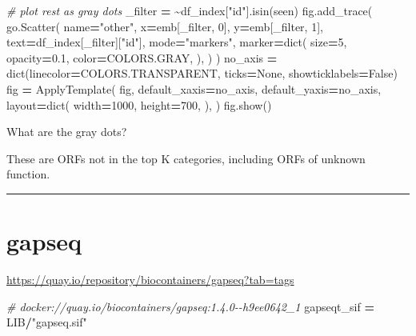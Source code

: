\documentclass[
]{book}
\newenvironment{Shaded}{\begin{snugshade}}{\end{snugshade}}
\newcommand{\BuiltInTok}[1]{#1}
\newcommand{\CommentTok}[1]{\textcolor[rgb]{0.56,0.35,0.01}{\textit{#1}}}
\newcommand{\DecValTok}[1]{\textcolor[rgb]{0.00,0.00,0.81}{#1}}
\newcommand{\FloatTok}[1]{\textcolor[rgb]{0.00,0.00,0.81}{#1}}
\newcommand{\NormalTok}[1]{#1}
\newcommand{\OperatorTok}[1]{\textcolor[rgb]{0.81,0.36,0.00}{\textbf{#1}}}
\newcommand{\StringTok}[1]{\textcolor[rgb]{0.31,0.60,0.02}{#1}}
\newcommand{\VariableTok}[1]{\textcolor[rgb]{0.00,0.00,0.00}{#1}}
\begin{document}
\begin{Shaded}
\begin{Highlighting}[numbers=left,,]
\CommentTok{\# plot rest as gray dots}
\NormalTok{\_filter }\OperatorTok{=} \OperatorTok{\textasciitilde{}}\NormalTok{df\_index[}\StringTok{"id"}\NormalTok{].isin(seen)}
\NormalTok{fig.add\_trace(}
\NormalTok{    go.Scatter(}
\NormalTok{        name}\OperatorTok{=}\StringTok{"other"}\NormalTok{,}
\NormalTok{        x}\OperatorTok{=}\NormalTok{emb[\_filter, }\DecValTok{0}\NormalTok{],}
\NormalTok{        y}\OperatorTok{=}\NormalTok{emb[\_filter, }\DecValTok{1}\NormalTok{],}
\NormalTok{        text}\OperatorTok{=}\NormalTok{df\_index[\_filter][}\StringTok{"id"}\NormalTok{],}
\NormalTok{        mode}\OperatorTok{=}\StringTok{"markers"}\NormalTok{,}
\NormalTok{        marker}\OperatorTok{=}\BuiltInTok{dict}\NormalTok{(}
\NormalTok{            size}\OperatorTok{=}\DecValTok{5}\NormalTok{, opacity}\OperatorTok{=}\FloatTok{0.1}\NormalTok{,}
\NormalTok{            color}\OperatorTok{=}\NormalTok{COLORS.GRAY,}
\NormalTok{        ),}
\NormalTok{    )}
\NormalTok{)}
\NormalTok{no\_axis }\OperatorTok{=} \BuiltInTok{dict}\NormalTok{(linecolor}\OperatorTok{=}\NormalTok{COLORS.TRANSPARENT, ticks}\OperatorTok{=}\VariableTok{None}\NormalTok{, showticklabels}\OperatorTok{=}\VariableTok{False}\NormalTok{)}
\NormalTok{fig }\OperatorTok{=}\NormalTok{ ApplyTemplate(}
\NormalTok{    fig,}
\NormalTok{    default\_xaxis}\OperatorTok{=}\NormalTok{no\_axis, default\_yaxis}\OperatorTok{=}\NormalTok{no\_axis,}
\NormalTok{    layout}\OperatorTok{=}\BuiltInTok{dict}\NormalTok{(}
\NormalTok{        width}\OperatorTok{=}\DecValTok{1000}\NormalTok{,}
\NormalTok{        height}\OperatorTok{=}\DecValTok{700}\NormalTok{,}
\NormalTok{    ),}
\NormalTok{)}
\NormalTok{fig.show()}
\end{Highlighting}
\end{Shaded}

What are the gray dots?

These are ORFs not in the top K categories, including ORFs of unknown function.

\begin{center}\rule{0.5\linewidth}{0.5pt}\end{center}

\section{gapseq}\label{gapseq}

\url{https://quay.io/repository/biocontainers/gapseq?tab=tags}

\begin{Shaded}
\begin{Highlighting}[numbers=left,,]
\CommentTok{\# docker://quay.io/biocontainers/gapseq:1.4.0{-}{-}h9ee0642\_1}
\NormalTok{gapseqt\_sif }\OperatorTok{=}\NormalTok{ LIB}\OperatorTok{/}\StringTok{"gapseq.sif"}
\end{Highlighting}
\end{Shaded}
\end{document}

